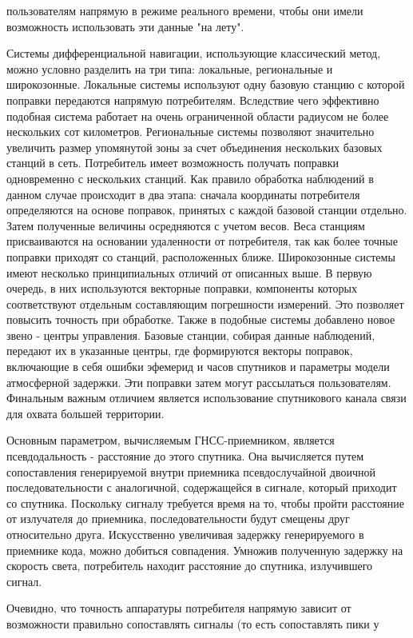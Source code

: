 \documentclass[a4paper,12pt]{report}
\begin{document}
пользователям напрямую в режиме реального времени, чтобы они имели возможность использовать эти данные "на лету". \par
Системы дифференциальной навигации, использующие классический метод, можно условно разделить на три типа: локальные, региональные и 
широкозонные. Локальные системы используют одну базовую станцию с которой поправки передаются напрямую потребителям. Вследствие чего эффективно 
подобная система работает на очень ограниченной области радиусом не более нескольких сот километров. Региональные системы позволяют значительно 
увеличить размер упомянутой зоны за счет объединения нескольких базовых станций в сеть. Потребитель имеет возможность получать поправки 
одновременно с нескольких станций. Как правило обработка наблюдений в данном случае происходит в два этапа: сначала координаты потребителя 
определяются на основе поправок, принятых с каждой базовой станции отдельно. Затем полученные величины осредняются с учетом весов.
Веса станциям присваиваются на основании удаленности от потребителя, так как более точные поправки приходят со станций, расположенных ближе. 
Широкозонные системы имеют несколько принципиальных отличий от описанных выше. В первую очередь, в них используются векторные поправки, 
компоненты которых соответствуют отдельным составляющим погрешности измерений. Это позволяет повысить точность при обработке. Также в подобные 
системы добавлено новое звено - центры управления. Базовые станции, собирая данные наблюдений, передают их в указанные центры, где формируются 
векторы поправок, включающие в себя ошибки эфемерид и часов спутников и параметры модели атмосферной задержки. Эти поправки затем могут 
рассылаться пользователям. Финальным важным отличием является использование спутникового канала связи для охвата большей территории. \par
Основным параметром, вычисляемым ГНСС-приемником, является псевдодальность - расстояние до этого спутника. Она вычисляется путем 
сопоставления генерируемой внутри приемника псевдослучайной двоичной последовательности с аналогичной, содержащейся в сигнале, который 
приходит со спутника. Поскольку сигналу требуется время на то, чтобы пройти расстояние от излучателя до приемника, последовательности будут 
смещены друг относительно друга. Искусственно увеличивая задержку генерируемого в приемнике кода, можно добиться совпадения. Умножив полученную 
задержку на скорость света, потребитель находит расстояние до спутника, излучившего сигнал. \par
Очевидно, что точность аппаратуры потребителя напрямую зависит от возможности правильно сопоставлять сигналы (то есть сопоставлять пики у 
\end{document}

